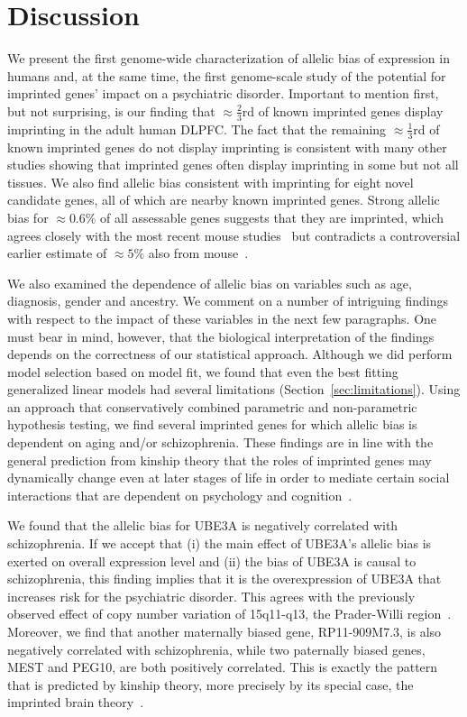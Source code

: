 \documentclass[12pt,letterpaper]{article}
\begin{document}
\section{Discussion}

We present the first genome-wide characterization of allelic bias of
expression in humans and, at the same time, the first genome-scale study of
the potential for imprinted genes' impact on a psychiatric disorder. Important
to mention first, but not surprising, is our finding that \(\approx
\frac{2}{3}\)rd of known imprinted genes display imprinting in the adult human
DLPFC. The fact that the remaining \(\approx \frac{1}{3}\)rd of known
imprinted genes do not display imprinting is consistent with many other
studies showing that imprinted genes often display imprinting in some but not
all tissues. We also find allelic bias consistent with imprinting for eight
novel candidate genes, all of which are nearby known imprinted genes.  Strong
allelic bias for \(\approx 0.6\%\) of all assessable genes suggests that they
are imprinted, which agrees closely with the most recent mouse
studies~\cite{DeVeale2012,Perez2015} but contradicts a controversial earlier
estimate of \(\approx 5\%\) also from mouse~\cite{Gregg2010a}.

We also examined the dependence of allelic bias on variables such as age,
diagnosis, gender and ancestry. We comment on a number of intriguing findings
with respect to the impact of these variables in the next few paragraphs.  One
must bear in mind, however, that the biological interpretation of the findings
depends on the correctness of our statistical approach.  Although we did
perform model selection based on model fit, we found that even the best
fitting generalized linear models had several limitations
(Section~\ref{sec:limitations}).  Using an approach that conservatively
combined parametric and non-parametric hypothesis testing, we find several
imprinted genes for which allelic bias is dependent on aging and/or
schizophrenia. These findings are in line with the general prediction from
kinship theory that the roles of imprinted genes may dynamically change even
at later stages of life in order to mediate certain social interactions that
are dependent on psychology and cognition~\cite{Ubeda2012,Wilkins2003}.

We found that the allelic bias for UBE3A is negatively correlated with
schizophrenia.  If we accept that (i) the main effect of UBE3A's allelic bias
is exerted on overall expression level and (ii) the bias of UBE3A is causal to
schizophrenia, this finding implies that it is the overexpression of UBE3A
that increases risk for the psychiatric disorder.  This agrees with the previously
observed effect of copy number variation of 15q11-q13, the Prader-Willi
region~\cite{McNamara2013}.  Moreover, we find that another maternally biased
gene, RP11-909M7.3, is also negatively correlated with schizophrenia, while
two paternally biased genes, MEST and PEG10, are both positively correlated.
This is exactly the pattern that is predicted by kinship theory, more
precisely by its special case, the imprinted brain theory~\cite{Crespi2008a}.
\end{document}
